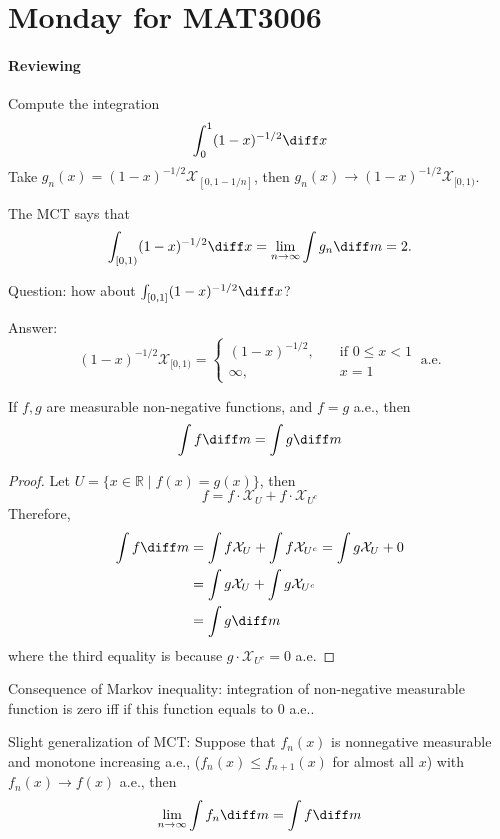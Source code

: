 
\section{Monday for MAT3006}

\paragraph{Reviewing}
Compute the integration
\[
\int_0^1(1-x)^{-1/2}\diff x
\]
Take $g_n(x) = (1-x)^{-1/2}\mathcal{X}_{[0,1-1/n]}$, then $g_n(x)\to (1-x)^{-1/2}\mathcal{X}_{[0,1)}$.

The MCT says that
\[
\int_{[0,1)}(1-x)^{-1/2}\diff x=\lim_{n\to\infty}\int g_n\diff m
=
2.
\]

Question: how about $\int_{[0,1]}(1-x)^{-1/2}\diff x$?

Answer: 
\[
(1-x)^{-1/2}\mathcal{X}_{[0,1)}=\left\{
\begin{aligned}
(1-x)^{-1/2},&\quad\text{if $0\le x<1$}\\
\infty,&\quad x=1
\end{aligned}
\right.\ \text{a.e.}
\]
\begin{proposition}
If $f,g$ are measurable non-negative functions, and $f=g$ a.e., then
\[
\int f\diff m=\int g\diff m
\]
\end{proposition}
\begin{proof}
Let $U=\{x\in\mathbb{R}\mid f(x) = g(x)\}$, then
\[
f=f\cdot \mathcal{X}_{U}+f\cdot \mathcal{X}_{U^c}
\]
Therefore,
\begin{align*}
\int f\diff m &= \int f \mathcal{X}_{U} + \int f\mathcal{X}_{U^c}=\int g \mathcal{X}_{U}+0\\
&=\int g\mathcal{X}_{U} + \int g\mathcal{X}_{U^c}\\
&=\int g\diff m
\end{align*}
where the third equality is because $g\cdot\mathcal{X}_{U^c}=0$ a.e.
\end{proof}
\begin{remark}
Consequence of Markov inequality:
integration of non-negative measurable function is zero iff if this function equals to 0 a.e..
\end{remark}

\begin{proposition}
Slight generalization of MCT: 
Suppose that $f_n(x)$ is nonnegative measurable and monotone increasing a.e., ($f_n(x)\le f_{n+1}(x)$ for almost all $x$) with $f_n(x)\to f(x)$ a.e., then
\[
\lim_{n\to\infty}\int f_n\diff m = \int f\diff m
\]
\end{proposition}

